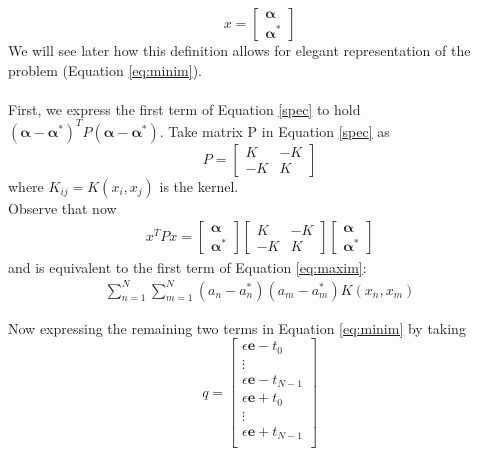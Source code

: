 \documentclass[12pt,notitlepage,twoside]{scrbook}
\begin{document}
\[x =
  \begin{bmatrix}
    \bm{ \alpha} \\
    \bm{ \alpha^*}
  \end{bmatrix}
\]
We will see later how this definition allows for elegant representation of
the problem (Equation \ref{eq:minim}).
\paragraph*{}
First, we express the first term of Equation \ref{spec} to hold \((\bm{\alpha-\alpha^*})^T
P (\bm{\alpha - \alpha^*})\).
Take matrix P in Equation \ref{spec} as 
\[P =
\begin{bmatrix}
       K & -K           \\
       -K & K            
     \end{bmatrix}
\]
where \(K_{ij} = K(x_i,x_j)\) is the kernel.
\\
Observe that now
\begin{gather*}
x^T P x =
  \begin{bmatrix}
    \bm{ \alpha} \\
    \bm{ \alpha^*}
  \end{bmatrix}
\begin{bmatrix}
       K & -K           \\
       -K & K            
     \end{bmatrix}
  \begin{bmatrix}
    \bm{ \alpha} \\
    \bm{ \alpha^*}
  \end{bmatrix}
\end{gather*}
and is equivalent to the first term of Equation \ref{eq:maxim}:
\begin{gather*}
\sum_{n=1}^{N}\sum_{m=1}^{N}(a_n-a_n^*)(a_m-a_m^*)K(x_n,x_m)
\end{gather*}

Now expressing the remaining two terms in Equation \ref{eq:minim} by taking 
\[q =
\begin{bmatrix}
  \epsilon\mathbf{e}-t_0           \\
  \vdots                                     \\
  \epsilon\mathbf{e}-t_{N-1}           \\
   \epsilon\mathbf{e}+t_0           \\
   \vdots                           \\
  \epsilon\mathbf{e}+t_{N-1}           \\
     \end{bmatrix}
\]
\end{document}
